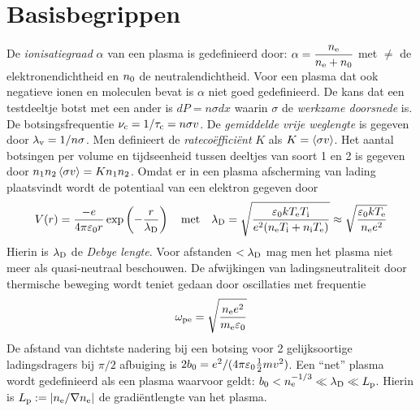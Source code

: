 \documentclass[twoside]{report}
\begin{document}
\section{Basisbegrippen}
De {\it ionisatiegraad} $\alpha$ van een plasma is gedefinieerd door:
$\displaystyle\alpha=\frac{\ne}{\ne+\no}$
\npar
met $\ne$ de elektronendichtheid en $\no$ de neutralendichtheid. Voor een
plasma dat ook negatieve ionen en moleculen bevat is $\alpha$ niet goed
gedefinieerd.
\npar
De kans dat een testdeeltje botst met een ander is $dP=n\sigma dx$ waarin
$\sigma$ de {\it werkzame doorsnede} is. De botsingsfrequentie
$\nu_{\rm c}=1/\tau_{\rm c}=n\sigma v$. De {\it gemiddelde vrije weglengte}
is gegeven door $\lambda_{\rm v}=1/n\sigma$. Men definieert de
{\it rateco\"effici\"ent} $K$ als $K=\av{\sigma v}$. Het aantal botsingen per
volume en tijdseenheid tussen deeltjes van soort 1 en 2 is gegeven door
$n_1n_2\av{\sigma v}=Kn_1n_2$.
\npar
Omdat er in een plasma afscherming van lading plaatsvindt wordt de potentiaal
van een elektron gegeven door
\[
V(r)=\frac{-e}{4\pi\varepsilon_0r}\exp\left(-\frac{r}{\lambda_{\rm D}}\right)
~~~\mbox{met}~~~
\lambda_{\rm D}=\sqrt{\frac{\varepsilon_0k\Te\Ti}{e^2(\ne\Ti+\ni\Te)}}\approx
\sqrt{\frac{\varepsilon_0k\Te}{\ne e^2}}
\]
Hierin is $\lambda_{\rm D}$ de {\it Debye lengte}. Voor afstanden
$<\lambda_{\rm D}$ mag men het plasma niet meer als quasi-neutraal beschouwen.
De afwijkingen van ladingsneutraliteit door thermische beweging wordt teniet
gedaan door oscillaties met frequentie
\[
\omega_{\rm pe}=\sqrt{\frac{\ne e^2}{m_{\rm e}\varepsilon_0}}
\]
De afstand van dichtste nadering bij een botsing voor 2 gelijksoortige
ladingsdragers bij $\pi/2$ afbuiging is
$2b_0=e^2/(4\pi\varepsilon_0\half mv^2)$. Een ``net'' plasma wordt
gedefinieerd als een plasma waarvoor geldt:
$b_0<\ne^{-1/3}\ll\lambda_{\rm D}\ll L_{\rm p}$. Hierin is
$L_{\rm p}:=|\ne/\nabla\ne|$ de gradi\"entlengte van het plasma.
\end{document}
